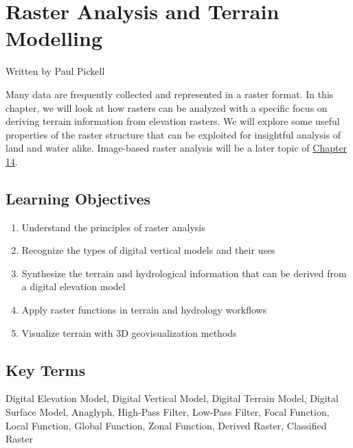 \documentclass[
]{book}
\providecommand{\tightlist}{%
  \setlength{\itemsep}{0pt}\setlength{\parskip}{0pt}}
\begin{document}
\hypertarget{raster-analysis-and-terrain-modelling}{%
\chapter{Raster Analysis and Terrain Modelling}\label{raster-analysis-and-terrain-modelling}}

Written by
Paul Pickell

Many data are frequently collected and represented in a raster format. In this chapter, we will look at how rasters can be analyzed with a specific focus on deriving terrain information from elevation rasters. We will explore some useful properties of the raster structure that can be exploited for insightful analysis of land and water alike. Image-based raster analysis will be a later topic of \href{https://ubc-geomatics-textbook.github.io/geomatics-textbook/image-analysis.html}{Chapter 14}.

\hypertarget{learning-objectives-8}{%
\section*{Learning Objectives}\label{learning-objectives-8}}

\begin{enumerate}
\def\labelenumi{\arabic{enumi}.}
\tightlist
\item
  Understand the principles of raster analysis
\item
  Recognize the types of digital vertical models and their uses
\item
  Synthesize the terrain and hydrological information that can be derived from a digital elevation model
\item
  Apply raster functions in terrain and hydrology workflows
\item
  Visualize terrain with 3D geovisualization methods
\end{enumerate}

\hypertarget{key-terms-8}{%
\section*{Key Terms}\label{key-terms-8}}

Digital Elevation Model, Digital Vertical Model, Digital Terrain Model, Digital Surface Model, Anaglyph, High-Pass Filter, Low-Pass Filter, Focal Function, Local Function, Global Function, Zonal Function, Derived Raster, Classified Raster
\end{document}
